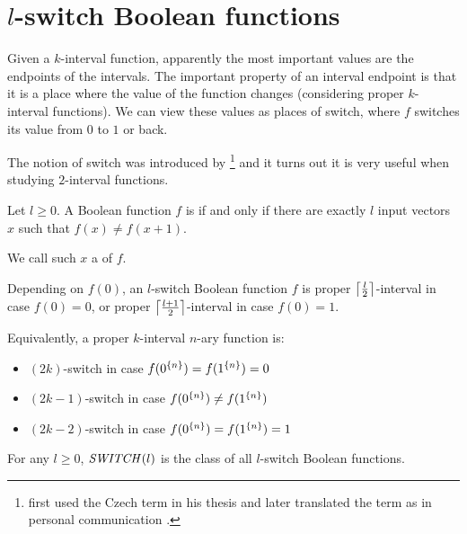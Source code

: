 \section{\texorpdfstring{$l$}{l}-switch Boolean functions}

Given a $k$-interval function,
apparently the most important values are the endpoints of the intervals.
The important property of an interval endpoint is that
it is a place where the value of the function changes
(considering proper $k$-interval functions).
We can view these values as places of switch,
where $f$ switches its value from $0$ to $1$ or back.

The notion of switch was introduced by \citeauthor{Husek2014}\footnote{
\citeauthor{Husek2014} first used the Czech term
in his thesis \citep[p.~13]{Husek2014}
and later translated the term as 
in personal communication \citep{Husek2015}.
}
and it turns out it is very useful when studying $2$-interval functions.

\begin{definition}
Let $l \geq 0$.
A Boolean function $f$ is 
if and only if
there are exactly $l$ input vectors $x$ such that
$f(x) \neq f(x+1)$.

We call such $x$ a  of $f$.
\end{definition}

\begin{example}
\label{example:switchesintervals}
Depending on $f(0)$,
an $l$-switch Boolean function $f$
is proper $\ceil*{\frac{l}{2}}$-interval
in case $f(0) = 0$,
or proper $\ceil*{\frac{l+1}{2}}$-interval
in case $f(0) = 1$.

Equivalently,
a proper $k$-interval $n$-ary function is:
\begin{itemize}
\item
$(2k)$-switch in case $f(\rep{0}{n}) = f(\rep{1}{n}) = 0$
\item
$(2k-1)$-switch in case $f(\rep{0}{n}) \neq f(\rep{1}{n})$
\item
$(2k-2)$-switch in case $f(\rep{0}{n}) = f(\rep{1}{n}) = 1$
\end{itemize}
\end{example}


\begin{definition}
[$\switchfns{l}$]
\label{def:switchfns}
For any $l \geq 0$,
$\switchfns{l}$ is the class
of all $l$-switch Boolean functions.
\end{definition}
